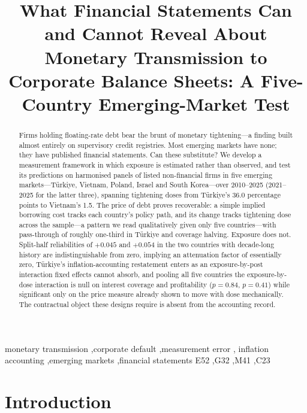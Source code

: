 \documentclass[review,12pt,authoryear]{elsarticle}
\theoremstyle{plain}
\theoremstyle{definition}
\begin{document}
\begin{frontmatter}

\title{What Financial Statements Can and Cannot Reveal About Monetary
Transmission to Corporate Balance Sheets: A Five-Country Emerging-Market Test}


\begin{abstract}
Firms holding floating-rate debt bear the brunt of monetary tightening---a
finding built almost entirely on supervisory credit registries. Most emerging
markets have none; they have published financial statements. Can these
substitute? We develop a measurement framework in which exposure is estimated
rather than observed, and test its predictions on harmonised panels of listed
non-financial firms in five emerging markets---T\"{u}rkiye, Vietnam, Poland,
Israel and South Korea---over 2010--2025 (2021--2025 for the latter three),
spanning tightening doses from T\"{u}rkiye's 36.0 percentage points to
Vietnam's 1.5. The price of debt proves recoverable: a
simple implied borrowing cost tracks each country's policy path, and its change
tracks tightening dose across the sample---a pattern we read qualitatively
given only five countries---with pass-through of roughly one-third in
T\"{u}rkiye and coverage halving. Exposure does
not. Split-half reliabilities of $+0.045$ and $+0.054$ in the two countries with
decade-long history are indistinguishable from zero, implying an attenuation
factor of essentially zero, T\"{u}rkiye's
inflation-accounting restatement enters as an exposure-by-post interaction
fixed effects cannot absorb, and pooling all five countries the exposure-by-dose
interaction is null on interest coverage and profitability ($p=0.84$,
$p=0.41$) while significant only on the price measure already shown to move
with dose mechanically. The contractual object these designs require is absent
from the accounting record.
\end{abstract}

\begin{keyword}
monetary transmission \sep corporate default \sep measurement error \sep
inflation accounting \sep emerging markets \sep financial statements
\JEL E52 \sep G32 \sep M41 \sep C23
\end{keyword}

\end{frontmatter}

\linenumbers

\section{Introduction}
\label{sec:intro}
\end{document}
